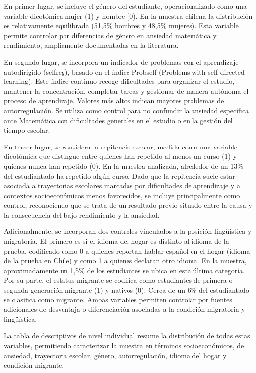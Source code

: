 \documentclass[
  spanish,
  a4paper,
  oneside]{scrbook}
\begin{document}
En primer lugar, se incluye el género del estudiante, operacionalizado
como una variable dicotómica mujer (1) y hombre (0). En la muestra
chilena la distribución es relativamente equilibrada (51,5\% hombres y
48,5\% mujeres). Esta variable permite controlar por diferencias de
género en ansiedad matemática y rendimiento, ampliamente documentadas en
la literatura.

En segundo lugar, se incorpora un indicador de problemas con el
aprendizaje autodirigido (selfreg), basado en el índice Probself
(Problems with self-directed learning). Este índice continuo recoge
dificultades para organizar el estudio, mantener la concentración,
completar tareas y gestionar de manera autónoma el proceso de
aprendizaje. Valores más altos indican mayores problemas de
autorregulación. Se utiliza como control para no confundir la ansiedad
específica ante Matemática con dificultades generales en el estudio o en
la gestión del tiempo escolar.

En tercer lugar, se considera la repitencia escolar, medida como una
variable dicotómica que distingue entre quienes han repetido al menos un
curso (1) y quienes nunca han repetido (0). En la muestra analizada,
alrededor de un 13\% del estudiantado ha repetido algún curso. Dado que
la repitencia suele estar asociada a trayectorias escolares marcadas por
dificultades de aprendizaje y a contextos socioeconómicos menos
favorecidos, se incluye principalmente como control, reconociendo que se
trata de un resultado previo situado entre la causa y la consecuencia
del bajo rendimiento y la ansiedad.

Adicionalmente, se incorporan dos controles vinculados a la posición
lingüística y migratoria. El primero es si el idioma del hogar es
distinto al idioma de la prueba, codificado como 0 a quienes reportan
hablar español en el hogar (idioma de la prueba en Chile) y como 1 a
quienes declaran otro idioma. En la muestra, aproximadamente un 1,5\% de
los estudiantes se ubica en esta última categoría. Por su parte, el
estatus migrante se codifica como estudiantes de primera o segunda
generación migrante (1) y nativos (0). Cerca de un 6\% del estudiantado
se clasifica como migrante. Ambas variables permiten controlar por
fuentes adicionales de desventaja o diferenciación asociadas a la
condición migratoria y lingüística.

La tabla de descriptivos de nivel individual resume la distribución de
todas estas variables, permitiendo caracterizar la muestra en términos
socioeconómicos, de ansiedad, trayectoria escolar, género,
autorregulación, idioma del hogar y condición migrante.
\end{document}
